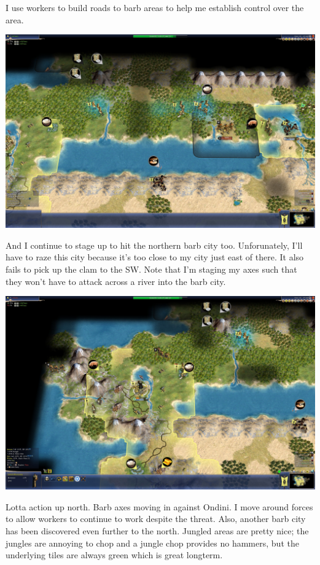 \documentclass[10pt]{article}
\begin{document}
I use workers to build roads to barb areas to help me establish control over the area.

\includegraphics[width=1.0\textwidth]{94}

And I continue to stage up to hit the northern barb city too. Unforunately, I'll have to raze this city because
it's too close to my city just east of there. It also fails to pick up the clam to the SW. Note that I'm staging my
axes such that they won't have to attack across a river into the barb city.

\includegraphics[width=1.0\textwidth]{96}

Lotta action up north. Barb axes moving in against Ondini. I move around forces to allow workers to continue to work
despite the threat. Also, another barb city has been discovered even further to the north. Jungled areas are pretty nice;
the jungles are annoying to chop and a jungle chop provides no hammers, but the underlying tiles are always green which
is great longterm.
\end{document}
